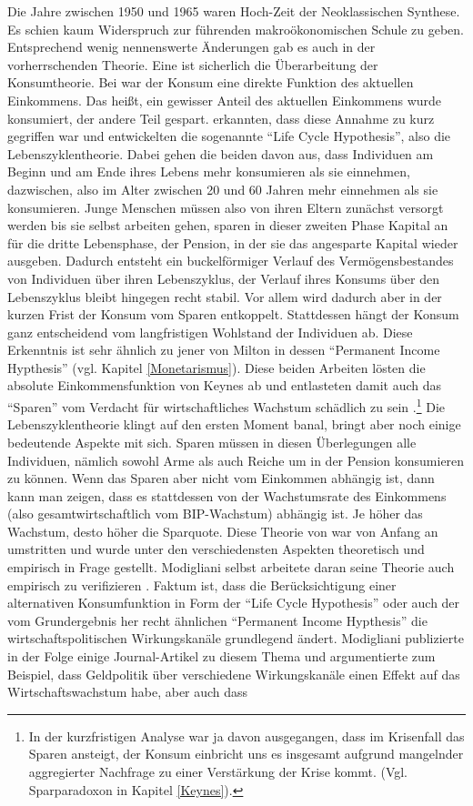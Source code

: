 Die Jahre zwischen 1950 und 1965 waren Hoch-Zeit der Neoklassischen Synthese. Es schien kaum Widerspruch zur führenden makroökonomischen Schule zu geben. Entsprechend wenig nennenswerte Änderungen gab es auch in der vorherrschenden Theorie. Eine ist sicherlich die Überarbeitung der Konsumtheorie. Bei \textcite{Keynes1936} war der Konsum eine direkte Funktion des aktuellen Einkommens. Das heißt, ein gewisser Anteil des aktuellen Einkommens wurde konsumiert, der andere Teil gespart. \textcite{Modigliani1954} erkannten, dass diese Annahme zu kurz gegriffen war und entwickelten die sogenannte "`Life Cycle Hypothesis"', also die Lebenszyklentheorie. Dabei gehen die beiden davon aus, dass Individuen am Beginn und am Ende ihres Lebens mehr konsumieren als sie einnehmen, dazwischen, also im Alter zwischen 20 und 60 Jahren mehr einnehmen als sie konsumieren. Junge Menschen müssen also von ihren Eltern zunächst versorgt werden bis sie selbst arbeiten gehen, sparen in dieser zweiten Phase Kapital an für die dritte Lebensphase, der Pension, in der sie das angesparte Kapital wieder ausgeben. Dadurch entsteht ein buckelförmiger Verlauf des Vermögensbestandes von Individuen über ihren Lebenszyklus, der Verlauf ihres Konsums über den Lebenszyklus bleibt hingegen recht stabil. Vor allem wird dadurch aber in der kurzen Frist der Konsum vom Sparen entkoppelt. Stattdessen hängt der Konsum ganz entscheidend vom langfristigen Wohlstand der Individuen ab. Diese Erkenntnis ist sehr ähnlich zu jener von Milton \textcite{Friedman1957} in dessen "`Permanent Income Hypthesis"' (vgl. Kapitel \ref{Monetarismus}). Diese beiden Arbeiten lösten die absolute Einkommensfunktion von Keynes ab und entlasteten damit auch das "`Sparen"' vom Verdacht für wirtschaftliches Wachstum schädlich zu sein \parencite{Modigliani1985}.\footnote{In der kurzfristigen Analyse war \textcite{Keynes1936} ja davon ausgegangen, dass im Krisenfall das Sparen ansteigt, der Konsum einbricht uns es insgesamt aufgrund mangelnder aggregierter Nachfrage zu einer Verstärkung der Krise kommt. (Vgl. Sparparadoxon in Kapitel \ref{Keynes}).} Die Lebenszyklentheorie klingt auf den ersten Moment banal, bringt aber noch einige bedeutende Aspekte mit sich. Sparen müssen in diesen Überlegungen alle Individuen, nämlich sowohl Arme als auch Reiche um in der Pension konsumieren zu können. Wenn das Sparen aber nicht vom Einkommen abhängig ist, dann kann man zeigen, dass es stattdessen von der Wachstumsrate des Einkommens (also gesamtwirtschaftlich vom BIP-Wachstum) abhängig ist. Je höher das Wachstum, desto höher die Sparquote. Diese Theorie von \textcite{Modigliani1954} war von Anfang an umstritten und wurde unter den verschiedensten Aspekten theoretisch und empirisch in Frage gestellt. Modigliani selbst arbeitete daran seine Theorie auch empirisch zu verifizieren \parencite{Deaton2005}. Faktum ist, dass die Berücksichtigung einer alternativen Konsumfunktion in Form der "`Life Cycle Hypothesis"' oder auch der vom Grundergebnis her recht ähnlichen "`Permanent Income Hypthesis"' die wirtschaftspolitischen Wirkungskanäle grundlegend ändert. Modigliani publizierte in der Folge einige Journal-Artikel zu diesem Thema und argumentierte zum Beispiel, dass Geldpolitik über verschiedene Wirkungskanäle einen Effekt auf das Wirtschaftswachstum habe, aber auch dass 